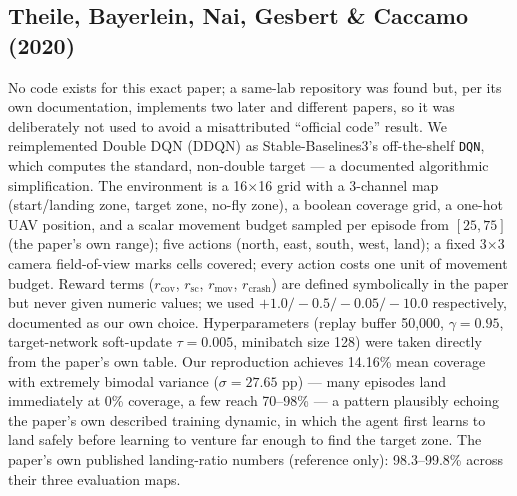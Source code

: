\documentclass[conference]{IEEEtran}
\begin{document}
\subsection{Theile, Bayerlein, Nai, Gesbert \& Caccamo (2020)}
No code exists for this exact paper; a same-lab repository was found but, per its own documentation, implements two later and different papers, so it was deliberately not used to avoid a misattributed ``official code'' result. We reimplemented Double DQN (DDQN) as Stable-Baselines3's off-the-shelf \texttt{DQN}, which computes the standard, non-double target --- a documented algorithmic simplification. The environment is a 16$\times$16 grid with a 3-channel map (start/landing zone, target zone, no-fly zone), a boolean coverage grid, a one-hot UAV position, and a scalar movement budget sampled per episode from $[25,75]$ (the paper's own range); five actions (north, east, south, west, land); a fixed 3$\times$3 camera field-of-view marks cells covered; every action costs one unit of movement budget. Reward terms ($r_{\text{cov}}$, $r_{\text{sc}}$, $r_{\text{mov}}$, $r_{\text{crash}}$) are defined symbolically in the paper but never given numeric values; we used $+1.0/-0.5/-0.05/-10.0$ respectively, documented as our own choice. Hyperparameters (replay buffer 50{,}000, $\gamma=0.95$, target-network soft-update $\tau=0.005$, minibatch size 128) were taken directly from the paper's own table. Our reproduction achieves 14.16\% mean coverage with extremely bimodal variance ($\sigma=27.65$ pp) --- many episodes land immediately at 0\% coverage, a few reach 70--98\% --- a pattern plausibly echoing the paper's own described training dynamic, in which the agent first learns to land safely before learning to venture far enough to find the target zone. The paper's own published landing-ratio numbers (reference only): 98.3--99.8\% across their three evaluation maps.
\end{document}
